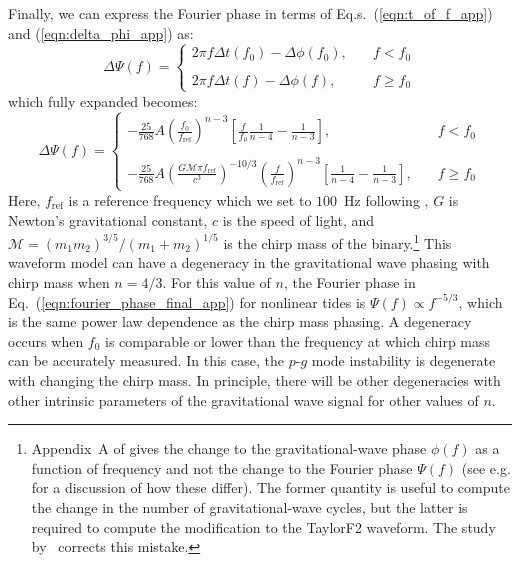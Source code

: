 Finally, we can express the Fourier phase in terms of Eq.s.~(\ref{eqn:t_of_f_app}) and (\ref{eqn:delta_phi_app}) as:
\begin{equation}\label{eqn:fourier_phase_app}
\Delta \Psi(f) = \left \{
                     \begin{array}{ll}
                      2 \pi f \Delta t(f_0) - \Delta \phi(f_0), &\quad  f < f_0 \\ \\
                      2 \pi f \Delta t(f) - \Delta \phi(f), &\quad f \ge f_0
                     \end{array}
                     \right.
\end{equation}
which fully expanded becomes:
\begin{equation}\label{eqn:fourier_phase_final_app}
\Delta \Psi(f) = \left \{
                     \begin{array}{ll}
                      - \frac{25}{768} A \left ( \frac{f_0}{f_{\mathrm{ref}}} \right)^{n-3} \left [ \frac{f}{f_0}\frac{1}{n-4} - \frac{1}{n-3} \right], &\quad  f < f_0 \\ \\
                      - \frac{25}{768} A \left (\frac{G \mathcal{M} \pi f_{\mathrm{ref}}}{c^3} \right )^{-10/3} \left ( \frac{f}{f_{\mathrm{ref}}} \right )^{n-3} \left [\frac{1}{n-4} - \frac{1}{n-3} \right ],  &\quad  f \ge f_0
                      \end{array}
                 \right.
\end{equation}
Here, $f_\mathrm{ref}$ is a reference frequency which we set to $100$~Hz following \cite{Essick:2016tkn}, $G$ is Newton's gravitational constant, $c$ is the speed of light, and $\mathcal{M} = (m_1 m_2)^{3/5}/(m_1+m_2)^{1/5}$ is the chirp mass of the binary.\footnote{Appendix~A of \cite{Essick:2016tkn} gives the change to the gravitational-wave phase $\phi(f)$ as a function of frequency and not the change to the Fourier phase $\Psi(f)$ (see e.g. \cite{Lindblom:2008cm} for a discussion of how these differ). The former quantity is useful to compute the change in the number of gravitational-wave cycles, but the latter is required to compute the modification to the TaylorF2 waveform. The study by~\cite{abbott2019constraining} corrects this mistake.} This waveform model can have a degeneracy in the gravitational wave phasing with chirp mass when $n = 4/3$. For this value of $n$, the Fourier phase in Eq.~(\ref{eqn:fourier_phase_final_app}) for nonlinear tides is $\Psi(f) \propto f^{-5/3}$, which is the same power law dependence as the chirp mass phasing. A degeneracy occurs when $f_0$ is comparable or lower than the frequency at which chirp mass can be accurately measured. In this case, the $p$-$g$ mode instability is degenerate with changing the chirp mass. In principle, there will be other degeneracies with other intrinsic parameters of the gravitational wave signal for other values of $n$.

